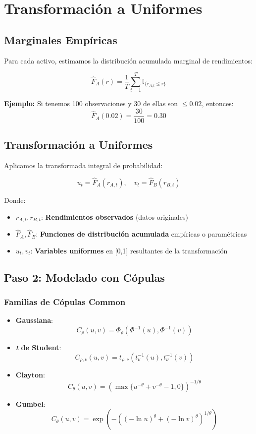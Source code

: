 \documentclass[12pt, a4paper]{myarticle}
\begin{document}
\section{Transformación a Uniformes}

\subsection{Marginales Empíricas}

Para cada activo, estimamos la distribución acumulada marginal de rendimientos:

\[
\hat{F}_A(r) = \frac{1}{T} \sum_{t=1}^T \mathbb{I}_{\{r_{A,t} \leq r\}}
\]

\textbf{Ejemplo:} Si tenemos 100 observaciones y 30 de ellas son \(\leq 0.02\), entonces:
\[
\hat{F}_A(0.02) = \frac{30}{100} = 0.30
\]
\subsection{Transformación a Uniformes}

Aplicamos la transformada integral de probabilidad:

\[
u_t = \hat{F}_A(r_{A,t}), \quad v_t = \hat{F}_B(r_{B,t})
\]

Donde:
\begin{itemize}
    \item \( r_{A,t}, r_{B,t} \): \textbf{Rendimientos observados} (datos originales)
    \item \( \hat{F}_A, \hat{F}_B \): \textbf{Funciones de distribución acumulada} empíricas o paramétricas
    \item \( u_t, v_t \): \textbf{Variables uniformes} en [0,1] resultantes de la transformación
\end{itemize}
\subsection{Paso 2: Modelado con Cópulas}

\subsubsection{Familias de Cópulas Common}

\begin{itemize}
    \item \textbf{Gaussiana}: 
    \[
    C_{\rho}(u,v) = \Phi_{\rho}(\Phi^{-1}(u), \Phi^{-1}(v))
    \]
    
    \item \textbf{\textit{t} de Student}:
    \[
    C_{\rho,\nu}(u,v) = t_{\rho,\nu}(t_{\nu}^{-1}(u), t_{\nu}^{-1}(v))
    \]
    
    \item \textbf{Clayton}:
    \[
    C_{\theta}(u,v) = \left( \max\{u^{-\theta} + v^{-\theta} - 1, 0\} \right)^{-1/\theta}
    \]
    
    \item \textbf{Gumbel}:
    \[
    C_{\theta}(u,v) = \exp\left( -\left( (-\ln u)^{\theta} + (-\ln v)^{\theta} \right)^{1/\theta} \right)
    \]
\end{itemize}
\end{document}
